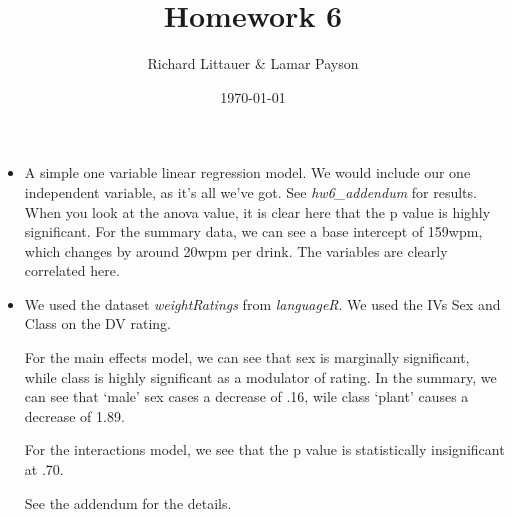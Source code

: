 \documentclass[11pt]{article}
\title{Homework 6}
\author{Richard Littauer \& Lamar Payson}
\date{\today}                          		%
\newenvironment{itemise}{
\begin{itemize}
  \setlength{\itemsep}{1pt}
  \setlength{\parskip}{0pt}
  \setlength{\parsep}{0pt}
}{\end{itemize}}
\begin{document}
\maketitle
\begin{itemise}
\item A simple one variable linear regression model. We would include our one independent variable, as it's all we've got. See {\it hw6\_addendum} for results. When you look at the anova value, it is clear here that the p value is highly significant. For the summary data, we can see a base intercept of 159wpm, which changes by around 20wpm per drink. The variables are clearly correlated here. 
\item We used the dataset {\it weightRatings} from {\it languageR}. We used the IVs Sex and Class on the DV rating. 

For the main effects model, we can see that sex is marginally significant, while class is highly significant as a modulator of rating. In the summary, we can see that `male' sex cases a decrease of .16, wile class `plant' causes a decrease of 1.89.

For the interactions model, we see that the p value is statistically insignificant at .70. 

See the addendum for the details. 
\end{itemise}






















%
%
\end{document}

